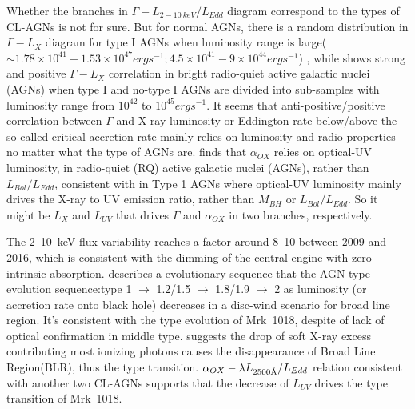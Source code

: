 \documentclass[twocolumn]{aastex63}
\newcommand{\angstrom}{\text{\normalfont\AA}}
\begin{document}
Whether the branches in $\Gamma-L_{2-10~keV}/L_{Edd}$ diagram correspond to the types of CL-AGNs is not for sure. But for normal AGNs, there is a random distribution in $\Gamma-L_X$ diagram for type I AGNs when luminosity range is large($\sim 1.78\times 10^{41}-1.53\times 10^{47} erg s^{-1} ; 4.5\times 10^{41}-9\times 10^{44} erg s^{-1}$) \citep[see][respectively]{1997MNRAS.286..513R,2015AASP....5...79S}, while \citet{2008AJ....135.1505S} shows strong and positive $\Gamma-L_X$ correlation in bright radio-quiet active galactic nuclei (AGNs) when type I and no-type I AGNs are divided into sub-samples with luminosity range from $10^{42}$ to $10^{45} erg s^{-1}$. It seems that anti-positive/positive correlation between $\Gamma$ and X-ray luminosity or Eddington rate below/above the so-called critical accretion rate mainly relies on luminosity and radio properties no matter what the type of AGNs are. \citet{2008ApJ...682...81S} finds that $\alpha_{OX}$ relies on optical-UV luminosity, in radio-quiet (RQ) active galactic nuclei (AGNs), rather than $L_{Bol}/L_{Edd}$, consistent with \citet{2012MNRAS.423..600S} in Type 1 AGNs where optical-UV luminosity mainly drives the X-ray to UV emission ratio, rather than $M_{BH}$ or $L_{Bol}/L_{Edd}$. So it might be $L_{X}$ and $L_{UV}$ that drives $\Gamma$ and $\alpha_{OX}$ in two branches, respectively.

The 2--10~keV flux variability reaches a factor around 8--10 between 2009 and 2016, which is consistent with the dimming of the central engine with zero intrinsic absorption. \citet{2014MNRAS.438.3340E} describes a evolutionary sequence that the AGN type evolution sequence:type 1 $\to$ 1.2/1.5 $\to$ 1.8/1.9 $\to$ 2 as luminosity (or accretion rate onto black hole) decreases in a disc-wind scenario for broad line region. It's consistent with the type evolution of Mrk~1018, despite of lack of optical confirmation in middle type. \citet{2018MNRAS.480.3898N} suggests the drop of soft X-ray excess contributing most ionizing photons causes the disappearance of Broad Line Region(BLR), thus the type transition. $\alpha_{OX}-\lambda L_{2500\angstrom}/L_{Edd}$ relation consistent with another two CL-AGNs supports that the decrease of $L_{UV}$ drives the type transition of Mrk~1018.
\end{document}
